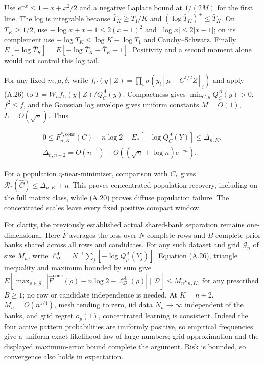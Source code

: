 \documentclass{article}
\begin{document}
Use \(e^{-x}\le1-x+x^2/2\) and a negative Laplace bound at \(1/(2M)\)
for the first line. The log is integrable because \(\bar T_K\ge T_1/K\)
and \((\log\bar T_K)^+\le\bar T_K\). On \(\bar T_K\ge1/2\), use
\(-\log x+x-1\le2(x-1)^2\) and \(|\log x|\le2|x-1|\); on its complement
use \(-\log\bar T_K\le\log K-\log T_1\) and Cauchy--Schwarz. Finally
\(E[-\log\bar T_K]=E[-\log\bar T_K+\bar T_K-1]\). Positivity and a
second moment alone would not control this log tail.

For any fixed \(m,\mu,\delta\), write
\(f_C(y\mid Z)=\prod_i\sigma(y_i[\mu+C^{1/2}Z]_i)\) and apply (A.26) to
\(T=W_nf_C(y\mid Z)/Q_C^A(y)\). Compactness gives
\(\min_{C,y}Q_C^A(y)>0\), \(f^2\le f\), and the Gaussian log envelope
gives uniform constants \(M=O(1)\), \(L=O(\sqrt n)\). Thus

\[
\begin{gathered}
0\le F_{n,K}^{*,\mathrm{conc}}(C)-n\log2-E_*[-\log Q_C^A(Y)]
\le\Delta_{n,K},\\
\Delta_{n,n+2}=O(n^{-1})+O((\sqrt n+\log n)e^{-cn}).
\end{gathered}
\tag{A.27}
\]

For a population \(\eta\)-near-minimizer, comparison with \(C_*\) gives
\(\mathcal R_*(\widehat C)\le\Delta_{n,K}+\eta\). This proves
concentrated population recovery, including on the full matrix class,
while (A.20) proves diffuse population failure. The concentrated scales
leave every fixed positive compact window.

For clarity, the previously established actual shared-bank separation
remains one-dimensional. Here \(\widehat F\) averages the loss over
\(N\) complete rows and \(B\) complete prior banks shared across all
rows and candidates. For any such dataset and grid \(\mathcal G_n\) of
size \(M_n\), write
\(\ell_{\mathcal D}^{A}=N^{-1}\sum_j[-\log Q_\rho^A(Y_j)]\). Equation
(A.26), triangle inequality and maximum bounded by sum give
\(E[\max_{\rho\in\mathcal G_n}|\widehat F^{\mathrm{conc}}(\rho)-n\log2-\ell_{\mathcal D}^{A}(\rho)|\mid\mathcal D]\le M_n\varepsilon_{n,K}\),
for any prescribed \(B\ge1\); no row or candidate independence is
needed. At \(K=n+2\), \(M_n=O(n^{1/4})\), mesh tending to zero, iid data
\(N_n\to\infty\) independent of the banks, and grid regret \(o_p(1)\),
concentrated learning is consistent. Indeed the four active pattern
probabilities are uniformly positive, so empirical frequencies give a
uniform exact-likelihood law of large numbers; grid approximation and
the displayed maximum-error bound complete the argument. Risk is
bounded, so convergence also holds in expectation.
\end{document}
